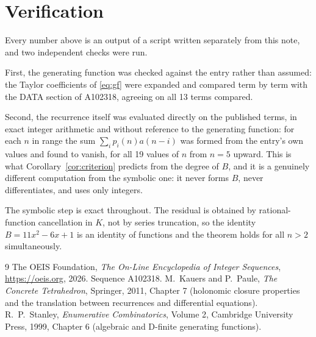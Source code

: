 \documentclass[11pt,a4paper]{article}
\theoremstyle{plain}
\theoremstyle{definition}
\begin{document}
\section{Verification}

Every number above is an output of a script written separately from this note, and two
independent checks were run.

First, the generating function was checked against the entry rather than assumed: the
Taylor coefficients of \eqref{eq:gf} were expanded and compared term by term with the DATA
section of A102318, agreeing on all 13 terms compared.

Second, the recurrence itself was evaluated directly on the published terms, in exact
integer arithmetic and without reference to the generating function: for each $n$ in range
the sum $\sum_{i}p_{i}(n)a(n-i)$ was formed from the entry's own values and found to
vanish, for all 19 values of $n$ from $n=5$ upward. This is what
Corollary~\ref{cor:criterion} predicts from the degree of $B$, and it is a genuinely
different computation from the symbolic one: it never forms $B$, never differentiates, and
uses only integers.

The symbolic step is exact throughout. The residual is obtained by rational-function
cancellation in $K$, not by series truncation, so the identity $B=11 x^{2} - 6 x + 1$ is an
identity of functions and the theorem holds for all $n>2$ simultaneously.

\begin{thebibliography}{9}
 The OEIS Foundation, \emph{The On-Line Encyclopedia of Integer Sequences},
\url{https://oeis.org}, 2026. Sequence A102318.
 M.~Kauers and P.~Paule, \emph{The Concrete Tetrahedron}, Springer, 2011,
Chapter 7 (holonomic closure properties and the translation between recurrences and
differential equations).
 R.~P.~Stanley, \emph{Enumerative Combinatorics}, Volume 2, Cambridge
University Press, 1999, Chapter 6 (algebraic and D-finite generating functions).
\end{thebibliography}
\end{document}
